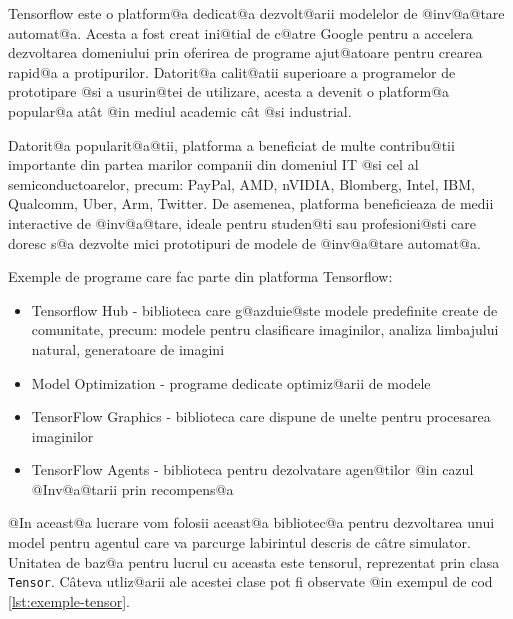 Tensorflow este o platform@a dedicat@a dezvolt@arii modelelor de @inv@a@tare automat@a. Acesta a fost creat ini@tial de c@atre Google pentru a accelera dezvoltarea domeniului prin oferirea de programe ajut@atoare pentru crearea rapid@a a protipurilor. Datorit@a calit@atii superioare a programelor de prototipare @si a usurin@tei de utilizare, acesta a devenit o platform@a popular@a at\^ at @in mediul academic c\^ at @si industrial.

Datorit@a popularit@a@tii, platforma a beneficiat de multe contribu@tii importante din partea marilor companii din domeniul IT @si cel al semiconductoarelor, precum: PayPal, AMD, nVIDIA, Blomberg, Intel, IBM, Qualcomm, Uber, Arm, Twitter. De asemenea, platforma beneficieaza de medii interactive de @inv@a@tare, ideale pentru studen@ti sau profesioni@sti care doresc s@a dezvolte mici prototipuri de modele de @inv@a@tare automat@a.

Exemple de programe care fac parte din platforma Tensorflow:
\begin{itemize}
	\item Tensorflow Hub - biblioteca care g@azduie@ste modele predefinite create de comunitate, precum: modele pentru clasificare imaginilor, analiza limbajului natural, generatoare de imagini
	\item Model Optimization - programe dedicate optimiz@arii de modele
	\item TensorFlow Graphics - biblioteca care dispune de unelte pentru procesarea imaginilor
	\item TensorFlow Agents - biblioteca pentru dezolvatare agen@tilor @in cazul @Inv@a@tarii prin recompens@a
\end{itemize}

@In aceast@a lucrare vom folosii aceast@a bibliotec@a pentru dezvoltarea unui model pentru agentul care va parcurge labirintul descris de c\^ atre simulator. Unitatea de baz@a pentru lucrul cu aceasta este tensorul, reprezentat prin clasa \texttt{Tensor}. C\^ ateva utliz@arii ale acestei clase pot fi observate @in exempul de cod \ref{lst:exemple-tensor}.

